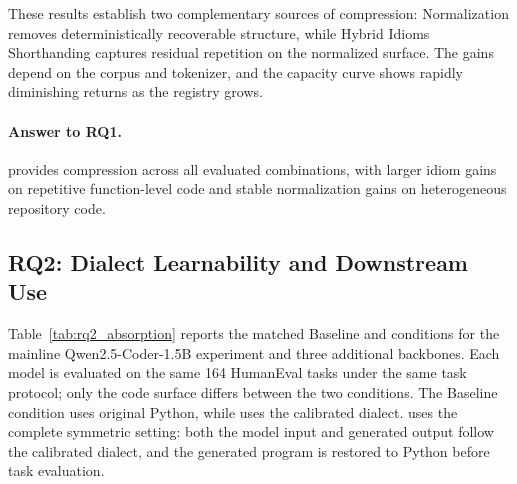 These results establish two complementary sources of compression: Normalization removes deterministically recoverable structure, while Hybrid Idioms Shorthanding captures residual repetition on the normalized surface. The gains depend on the corpus and tokenizer, and the capacity curve shows rapidly diminishing returns as the registry grows. \paragraph{Answer to RQ1.} \tool provides compression across all evaluated combinations, with larger idiom gains on repetitive function-level code and stable normalization gains on heterogeneous repository code.

\subsection{RQ2: Dialect Learnability and Downstream Use}
\label{subsec:rq2}

Table~\ref{tab:rq2_absorption} reports the matched Baseline and \tool conditions for the
mainline Qwen2.5-Coder-1.5B experiment and three additional backbones. Each model
is evaluated on the same 164 HumanEval tasks under the same task protocol;
only the code surface differs between the two conditions. The Baseline condition
uses original Python, while \tool uses the calibrated dialect. \tool uses the complete
symmetric setting: both the model input and generated output follow the
calibrated dialect, and the generated program is restored to Python before
task evaluation.

